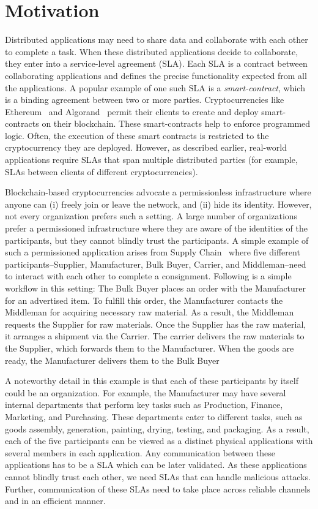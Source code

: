 \section{Motivation}
Distributed applications may need to share data and collaborate with each other to
complete a task.
When these distributed applications decide to collaborate, they enter into a service-level 
agreement (SLA). 
Each SLA is a contract between collaborating applications and 
defines the precise functionality expected from all the applications. 
A popular example of one such SLA is a {\em smart-contract}, which is a binding agreement 
between two or more parties.
Cryptocurrencies like Ethereum~\cite{ether} and Algorand~\cite{algorand} permit their 
clients to create and deploy smart-contracts on their blockchain. 
These smart-contracts help to enforce programmed logic.
Often, the execution of these smart contracts is restricted to the cryptocurrency 
they are deployed.
However, as described earlier, real-world applications require SLAs that span multiple distributed
parties (for example, SLAs between clients of different cryptocurrencies).

Blockchain-based cryptocurrencies advocate a permissionless infrastructure where anyone can 
(i) freely join or leave the network, and 
(ii) hide its identity.
However, not every organization prefers such a setting. 
A large number of organizations prefer a permissioned infrastructure where they are aware of the 
identities of the participants, but they cannot blindly trust the participants.
A simple example of such a permissioned application arises from Supply Chain~\cite{caper,business-process-blockchain} 
where five different participants--Supplier, Manufacturer, Bulk Buyer, Carrier, and Middleman--need 
to interact with each other to complete a consignment.
Following is a simple workflow in this setting: 
The Bulk Buyer places an order with the Manufacturer for an advertised item. 
To fulfill this order, the Manufacturer contacts the Middleman for acquiring necessary raw material. 
As a result, the Middleman requests the Supplier for raw materials. 
Once the Supplier has the raw material, it arranges a shipment via the Carrier. 
The carrier delivers the raw materials to the Supplier, which forwards them to the Manufacturer.
When the goods are ready, the Manufacturer delivers them to the Bulk Buyer

A noteworthy detail in this example is that each of these participants by itself could 
be an organization. 
For example, the Manufacturer may have several internal departments that 
perform key tasks such as Production, Finance, Marketing, and Purchasing.
These departments cater to different tasks, such as goods assembly, generation, painting, drying, testing, and packaging.
As a result, each of the five participants can be viewed as a distinct physical applications 
with several members in each application. 
Any communication between these applications has to be a SLA which can be later validated.
As these applications cannot blindly trust each other, we need SLAs that can handle malicious attacks. 
Further, communication of these SLAs need to take place across reliable channels and in an efficient manner.


